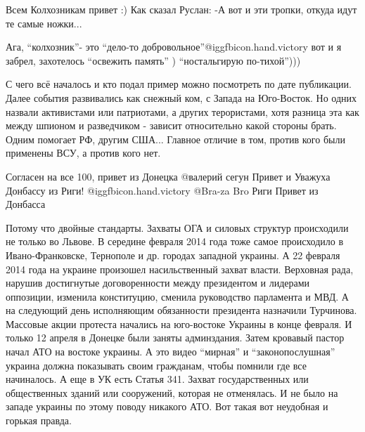 \begin{multicols}{2} %
\setlength{\parindent}{0pt}\em\color{magenta}


Всем Колхозникам привет :)
Как сказал Руслан: 
-А вот и эти тропки, откуда идут те самые ножки... 


Ага, \enquote{колхозник}- это \enquote{дело-то добровольное}@igg{fbicon.hand.victory} вот и я забрел,
захотелось \enquote{освежить память} )  \enquote{ностальгирую по-тихой}))) 


С чего всё началось и кто подал пример можно посмотреть по дате публикации.
Далее события развивались как снежный ком, с Запада на Юго-Восток. Но одних
назвали активистами или патриотами, а других терористами, хотя разница эта как
между  шпионом и разведчиком - зависит относительно какой стороны брать. Одним
помогает РФ, другим США... Главное отличие в том, против кого были применены
ВСУ, а против кого нет. 

\begin{itemize} %
Согласен на все 100, привет из Донецка
 @валерий сегун  Привет и Уважуха Донбассу из Риги! @igg{fbicon.hand.victory}
 @Bra-za Bro  Риги Привет из Донбасса 


Потому что двойные стандарты. Захваты ОГА и силовых структур происходили не
только во Львове. В середине февраля 2014 года тоже самое  происходило в
Ивано-Франковске, Тернополе и др. городах западной украины. А 22 февраля 2014
года на украине произошел насильственный захват власти. Верховная рада, нарушив
достигнутые договоренности между президентом и лидерами оппозиции, изменила
конституцию, сменила руководство парламента и МВД. А на следующий день
исполняющим обязанности президента назначили Турчинова. Массовые акции протеста
начались на юго-востоке Украины в конце февраля. И только 12 апреля в Донецке
были заняты админздания. Затем кровавый пастор начал АТО на востоке украины. А
это видео \enquote{мирная} и \enquote{законопослушная} украина должна показывать своим
гражданам, чтобы помнили где все начиналось. А еще в УК есть Статья 341. Захват
государственных или общественных зданий или сооружений, которая не отменялась.
И не было на западе украины по этому поводу никакого АТО. Вот такая вот
неудобная и горькая правда. 


\end{itemize}
\end{multicols}
